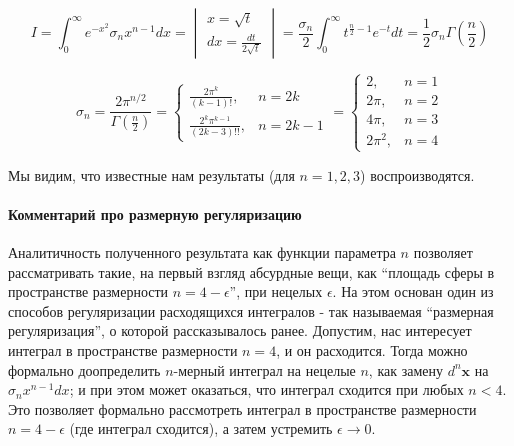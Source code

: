 \documentclass[a4paper,12pt]{article}
\begin{document}
\[
I=\int_{0}^{\infty}e^{-x^{2}}\sigma_{n}x^{n-1}dx=\begin{vmatrix}x=\sqrt{t}\\
dx=\frac{dt}{2\sqrt{t}}
\end{vmatrix}=\frac{\sigma_{n}}{2}\int_{0}^{\infty}t^{\frac{n}{2}-1}e^{-t}dt=\frac{1}{2}\sigma_{n}\Gamma\left(\frac{n}{2}\right)
\]


\[
\sigma_{n}=\frac{2\pi^{n/2}}{\Gamma\left(\frac{n}{2}\right)}=\begin{cases}
\frac{2\pi^{k}}{(k-1)!}, & n=2k\\
\frac{2^{k}\pi^{k-1}}{(2k-3)!!}, & n=2k-1
\end{cases}=\begin{cases}
2, & n=1\\
2\pi, & n=2\\
4\pi, & n=3\\
2\pi^{2}, & n=4
\end{cases}
\]

 \noindent
Мы видим, что известные нам результаты (для $n=1,2,3$) воспроизводятся.


\paragraph{Комментарий про размерную регуляризацию}

Аналитичность полученного результата как функции параметра $n$ позволяет
рассматривать такие, на первый взгляд абсурдные вещи, как ``площадь
сферы в пространстве размерности $n=4-\epsilon$'', при нецелых $\epsilon$.
На этом основан один из способов регуляризации расходящихся интегралов
- так называемая ``размерная регуляризация'', о которой рассказывалось
ранее. 
 \noindent
Допустим, нас интересует интеграл в пространстве размерности $n=4$,
и он расходится. Тогда можно формально доопределить $n$-мерный интеграл
на нецелые $n$, как замену $d^{n}\mathbf{x}$ на $\sigma_{n}x^{n-1}dx$;
и при этом может оказаться, что интеграл сходится при любых $n<4$.
Это позволяет формально рассмотреть интеграл в пространстве размерности
$n=4-\epsilon$ (где интеграл сходится), а затем устремить $\epsilon\to0$.
\end{document}
